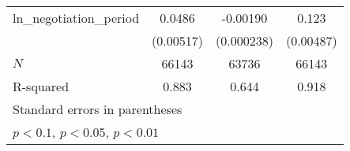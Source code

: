 {\begin{tabular}{l*{3}{c}}
\addlinespace
ln\_negotiation\_period&      0.0486\sym{***}&    -0.00190\sym{***}&       0.123\sym{***}\\
            &   (0.00517)         &  (0.000238)         &   (0.00487)         \\
\midrule
\(N\)       &       66143         &       63736         &       66143         \\
R-squared   &       0.883         &       0.644         &       0.918         \\
\bottomrule
\multicolumn{4}{l}{\footnotesize Standard errors in parentheses}\\
\multicolumn{4}{l}{\footnotesize \sym{*} \(p<0.1\), \sym{**} \(p<0.05\), \sym{***} \(p<0.01\)}\\
\end{tabular}
}
